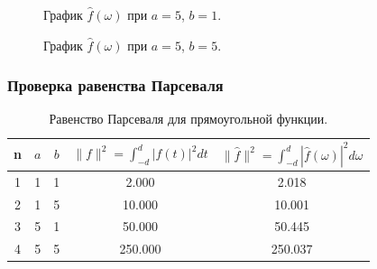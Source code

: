 \documentclass[a5paper, 10pt]{article}
\theoremstyle{definition}
\theoremstyle{plain}
\theoremstyle{remark}
\begin{document}
\begin{figure}[h!]
\caption{График $\hat{f} (\omega)$ при $a = 5$, $b = 1$.}
\caption{График $\hat{f} (\omega)$ при $a = 5$, $b = 5$.}
\end{figure}



\subsubsection{Проверка равенства Парсеваля}

\begin{table}[h!]
\caption{Равенство Парсеваля для прямоугольной функции.}
\label{tabular:timesandtenses}
\begin{center}
\begin{tabular}{|c|c|c|c|c|}
\hline
n & $a$ & $b$ & $\| f \|^2 = \int_{-d}^d |f(t)|^2 dt $ & $\| \hat{f} \|^2 = \int_{-d}^d |\hat{f}(\omega)|^2 d\omega $ \\
\hline
1 & 1 & 1 &  2.000& 2.018\\
\hline
2 & 1 & 5 & 10.000 & 10.001\\
\hline
3 & 5 & 1 & 50.000 & 50.445\\
\hline
4 & 5 & 5 & 250.000  & 250.037 \\
\hline
\end{tabular}
\end{center}
\end{table}
 
\end{document}
